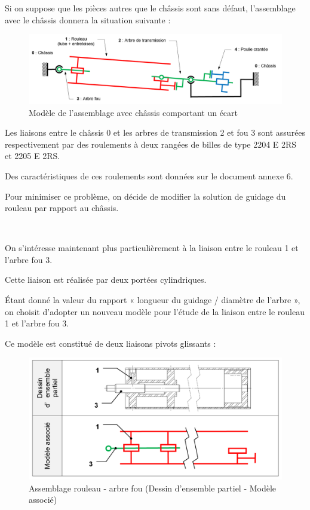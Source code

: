 Si on suppose que les pièces autres que le châssis sont sans défaut, l'assemblage avec le châssis donnera la situation suivante :

\begin{figure}[!h]
\begin{center}
	\includegraphics[width=0.6\linewidth]{img/fig24}
\end{center}
\caption{Modèle de l'assemblage avec châssis comportant un écart}
\label{fig24}
\end{figure} 

Les liaisons entre le châssis 0 et les arbres de transmission 2 et fou 3 sont assurées respectivement par des roulements à deux rangées de billes de type 2204 E 2RS et 2205 E 2RS.

Des caractéristiques de ces roulements sont données sur le document annexe 6.



Pour minimiser ce problème, on décide de modifier la solution de guidage du rouleau par rapport au châssis.


~\

On s'intéresse maintenant plus particulièrement à la liaison entre le rouleau 1 et l'arbre fou 3.

Cette liaison est réalisée par deux portées cylindriques.

Étant donné la valeur du rapport « longueur du guidage / diamètre de l'arbre », on choisit d'adopter un nouveau modèle pour l'étude de la liaison entre le rouleau 1 et l'arbre fou 3.

\newpage

Ce modèle est constitué de deux liaisons pivots glissants :

\begin{figure}[!h]
\begin{center}
	\includegraphics[width=0.6\linewidth]{img/fig25}
\end{center}
\caption{Assemblage rouleau - arbre fou (Dessin d'ensemble partiel - Modèle associé)}
\label{fig25}
\end{figure} 


